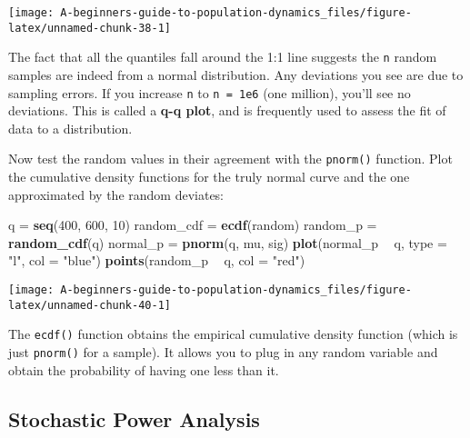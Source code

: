 \documentclass[]{book}
\newenvironment{Shaded}{\begin{snugshade}}{\end{snugshade}}
\newcommand{\DataTypeTok}[1]{\textcolor[rgb]{0.13,0.29,0.53}{#1}}
\newcommand{\DecValTok}[1]{\textcolor[rgb]{0.00,0.00,0.81}{#1}}
\newcommand{\KeywordTok}[1]{\textcolor[rgb]{0.13,0.29,0.53}{\textbf{#1}}}
\newcommand{\NormalTok}[1]{#1}
\newcommand{\OperatorTok}[1]{\textcolor[rgb]{0.81,0.36,0.00}{\textbf{#1}}}
\newcommand{\StringTok}[1]{\textcolor[rgb]{0.31,0.60,0.02}{#1}}
\begin{document}
\begin{center}\texttt{[image: A-beginners-guide-to-population-dynamics\_files/figure-latex/unnamed-chunk-38-1]} \end{center}

The fact that all the quantiles fall around the 1:1 line suggests the \texttt{n} random samples are indeed from a normal distribution. Any deviations you see are due to sampling errors. If you increase \texttt{n} to \texttt{n\ =\ 1e6} (one million), you'll see no deviations. This is called a \textbf{q-q plot}, and is frequently used to assess the fit of data to a distribution.

Now test the random values in their agreement with the \texttt{pnorm()} function. Plot the cumulative density functions for the truly normal curve and the one approximated by the random deviates:

\begin{Shaded}
\begin{Highlighting}[]
\NormalTok{q =}\StringTok{ }\KeywordTok{seq}\NormalTok{(}\DecValTok{400}\NormalTok{, }\DecValTok{600}\NormalTok{, }\DecValTok{10}\NormalTok{)}
\NormalTok{random_cdf =}\StringTok{ }\KeywordTok{ecdf}\NormalTok{(random)}
\NormalTok{random_p =}\StringTok{ }\KeywordTok{random_cdf}\NormalTok{(q)}
\NormalTok{normal_p =}\StringTok{ }\KeywordTok{pnorm}\NormalTok{(q, mu, sig)}
\KeywordTok{plot}\NormalTok{(normal_p }\OperatorTok{~}\StringTok{ }\NormalTok{q, }\DataTypeTok{type =} \StringTok{"l"}\NormalTok{, }\DataTypeTok{col =} \StringTok{"blue"}\NormalTok{)}
\KeywordTok{points}\NormalTok{(random_p }\OperatorTok{~}\StringTok{ }\NormalTok{q, }\DataTypeTok{col =} \StringTok{"red"}\NormalTok{)}
\end{Highlighting}
\end{Shaded}

\begin{center}\texttt{[image: A-beginners-guide-to-population-dynamics\_files/figure-latex/unnamed-chunk-40-1]} \end{center}

The \texttt{ecdf()} function obtains the empirical cumulative density function (which is just \texttt{pnorm()} for a sample). It allows you to plug in any random variable and obtain the probability of having one less than it.

\hypertarget{power-ex}{%
\subsection{Stochastic Power Analysis}\label{power-ex}}
\end{document}
